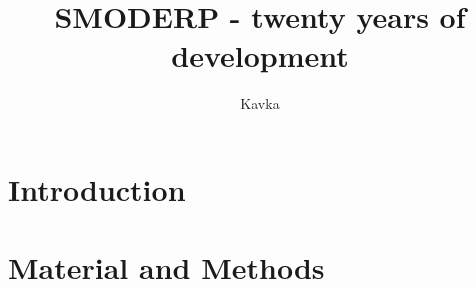 \documentclass[a4paper, 12pt, twoside]{article}
\begin{document}
%

\title{SMODERP - twenty years of development}
\author{Kavka}



%

\section{Introduction}


\section{Material and Methods}




\end{document}
